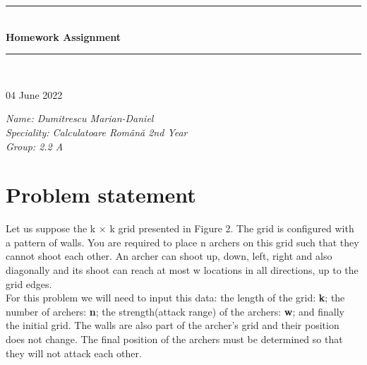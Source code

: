 \documentclass[12pt]{article}
\begin{document}
\begin{titlepage}
\newcommand{\HRule}{\rule{\linewidth}{0.5mm}}
\center
\HRule \\[.8cm]
{ \huge \bfseries Homework Assignment}\\[0.4cm]
\HRule \\[1cm]
\begin{center} 
04 June 2022
\end{center} 

\centering
\begin{minipage}{\textwidth}
\begin{flushleft} \large
\vspace{10cm}
\emph{Name: Dumitrescu Marian-Daniel }\\
\emph{Speciality: Calculatoare Română 2nd Year}\\
\emph{Group: 2.2 A}\\
\end{flushleft}
\end{minipage}

\vfill

\end{titlepage}

\section{Problem statement}
\hspace{0.5cm} Let us suppose the k × k grid presented in Figure 2. The grid is configured with a pattern of walls. You are required to place n archers on this grid such that they cannot shoot each other. An archer can shoot up, down, left, right and also diagonally and its shoot can reach at most w locations in all directions, up to the grid edges.\\

For this problem we will need to input this data: the length of the grid: \textbf{k}; the number of archers: \textbf{n}; the strength(attack range) of the archers: \textbf{w}; and finally the initial grid. The walls are also part of the archer's grid and their position does not change. The final position of the archers must be determined so that they will not attack each other.\\
\end{document}
